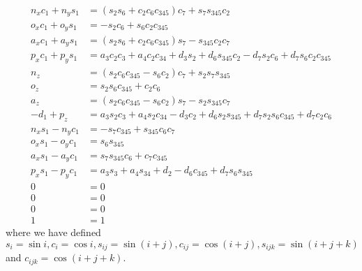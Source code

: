 \documentclass[onecolumn,10pt]{jhwhw}
\begin{document}
\begin{align}
n_{x} c_1 + n_{y} s_1 &= \left(s_{2} s_{6} + c_{2} c_{6} c_{345}\right) c_{7} + s_{7} s_{345} c_{2} \label{eq1} \\
o_{x} c_1 + o_{y} s_1 &= - s_{2} c_{6} + s_{6} c_{2} c_{345} \label{eq5} \\
a_{x} c_1 + a_{y} s_1 &= \left(s_{2} s_{6} + c_{2} c_{6} c_{345}\right) s_{7} - s_{345} c_{2} c_{7} \label{eq7} \\
p_{x} c_1 + p_{y} s_1 &= a_{3} c_{2} c_{3} + a_{4} c_{2} c_{34} + d_{3} s_{2} + d_{6} s_{345} c_{2} - d_{7} s_{2} c_{6} + d_{7} s_{6} c_{2} c_{345} \label{eq3} \\
n_{z}                 &= \left(s_{2} c_{6} c_{345} - s_{6} c_{2}\right) c_{7} + s_{2} s_{7} s_{345} \label{eq2} \\
o_{z}                 &= s_{2} s_{6} c_{345} + c_{2} c_{6} \label{eq6} \\
a_{z}                 &= \left(s_{2} c_{6} c_{345} - s_{6} c_{2}\right) s_{7} - s_{2} s_{345} c_{7} \label{eq8} \\
- d_{1} + p_{z}       &= a_{3} s_{2} c_{3} + a_{4} s_{2} c_{34} - d_{3} c_{2} + d_{6} s_{2} s_{345} + d_{7} s_{2} s_{6} c_{345} + d_{7} c_{2} c_{6} \label{eq4} \\
n_{x} s_1 - n_{y} c_1 &= - s_{7} c_{345} + s_{345} c_{6} c_{7} \\
o_{x} s_1 - o_{y} c_1 &= s_{6} s_{345} \\
a_{x} s_1 - a_{y} c_1 &= s_{7} s_{345} c_{6} + c_{7} c_{345} \\
p_{x} s_1 - p_{y} c_1 &= a_{3} s_{3} + a_{4} s_{34} + d_{2} - d_{6} c_{345} + d_{7} s_{6} s_{345} \\
0                     &= 0 \\
0                     &= 0 \\
0                     &= 0 \\
1                     &= 1
\end{align}
where we have defined $s_i = \sin{i}, c_i = \cos{i}, s_{ij} = \sin{\left(i+j\right)}, c_{ij} = \cos{\left(i+j\right)}, s_{ijk} = \sin{\left(i+j+k\right)}$ and $c_{ijk} = \cos{\left(i+j+k\right)}$.
\end{document}
